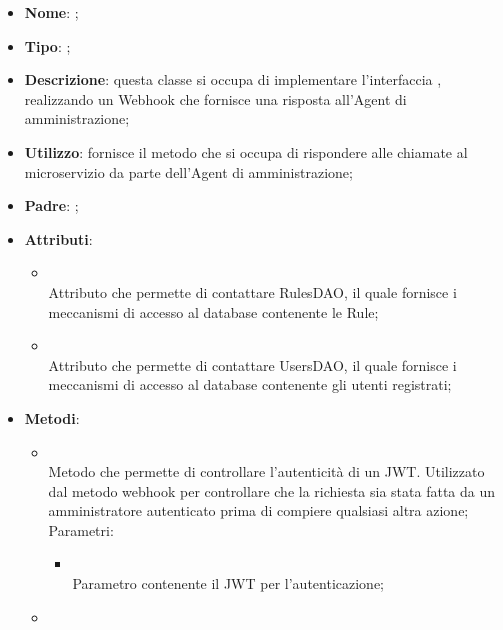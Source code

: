 \begin{itemize}
	\item \textbf{Nome}: ;
	\item \textbf{Tipo}: ;
	\item \textbf{Descrizione}: questa classe si occupa di implementare l'interfaccia , realizzando un Webhook che fornisce una risposta all'Agent di amministrazione;
	\item \textbf{Utilizzo}: fornisce il metodo che si occupa di rispondere alle chiamate al microservizio da parte dell'Agent di amministrazione;
	\item \textbf{Padre}: ;
	\item \textbf{Attributi}:
	\begin{itemize}
		\item[]  \\
		Attributo che permette di contattare RulesDAO, il quale fornisce i meccanismi di accesso al database contenente le Rule;
		\item[]  \\
		Attributo che permette di contattare UsersDAO, il quale fornisce i meccanismi di accesso al database contenente gli utenti registrati;
	\end{itemize}
	\item \textbf{Metodi}:
	\begin{itemize}
		\item[]  \\
		Metodo che permette di controllare l'autenticità di un JWT. Utilizzato dal metodo webhook per controllare che la richiesta sia stata fatta da un amministratore autenticato prima di compiere qualsiasi altra azione;\\
		Parametri:
		\begin{itemize}
			\item {} \\
			Parametro contenente il JWT per l'autenticazione;
		\end{itemize}
		\item[]  \\

\end{itemize}
\end{itemize}
